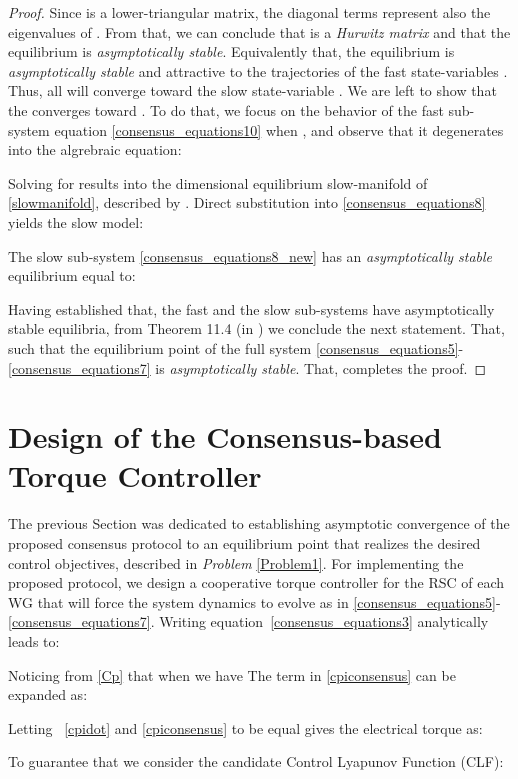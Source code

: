\documentclass[letterpaper, 10 pt, conference]{ieeeconf}
\begin{document}
\begin{proof}
Since  is a lower-triangular matrix, the diagonal terms represent also the eigenvalues of . From that, we can conclude that   is a \textit{Hurwitz matrix} and that the equilibrium  is \textit{asymptotically stable}. Equivalently that, the equilibrium  is \textit{asymptotically stable} and attractive to the trajectories of the fast state-variables . Thus, all  will converge toward the slow state-variable . We are left to show that the  converges toward . To do that, we focus on the behavior of the fast sub-system equation \eqref{consensus_equations10} when , and observe that it degenerates into the algrebraic equation:

Solving for  results into the  dimensional equilibrium slow-manifold of \eqref{slowmanifold}, described by . Direct substitution into \eqref{consensus_equations8} yields the slow model:

The slow sub-system \eqref{consensus_equations8_new} has an \textit{asymptotically stable} equilibrium equal to:
 
   Having established that, the fast and the slow sub-systems have asymptotically stable equilibria, from Theorem 11.4 (in \cite{khalil}) we conclude the next statement. That,  such that  the equilibrium point of the full system \eqref{consensus_equations5}-\eqref{consensus_equations7} is \textit{asymptotically stable}. That, completes the proof.\end{proof}
 

\section{Design of the Consensus-based Torque Controller}
The previous Section was dedicated to establishing asymptotic convergence of the proposed consensus protocol to an equilibrium point that realizes the desired control objectives, described in \textit{Problem} \ref{Problem1}.  For implementing the proposed protocol, we  design a cooperative torque controller for the RSC of each WG that will force the system dynamics to evolve as in \eqref{consensus_equations5}-\eqref{consensus_equations7}.  Writing equation~\eqref{consensus_equations3} analytically leads to:

Noticing from \eqref{Cp} that when   we have
 The term  in \eqref{cpiconsensus} can be expanded as:

Letting  ~\eqref{cpidot} and \eqref{cpiconsensus} to be equal gives the electrical torque   as:

To guarantee that  we consider the candidate Control Lyapunov Function (CLF):
\end{document}
